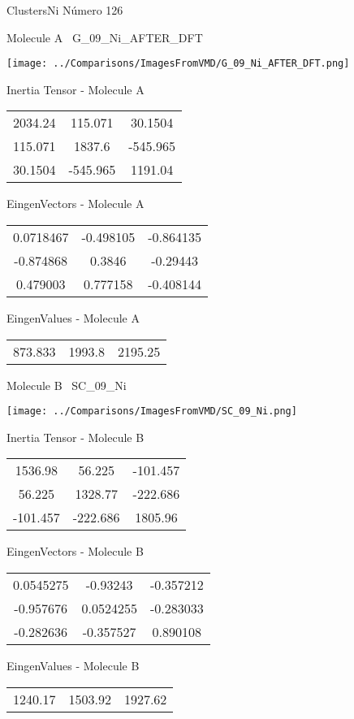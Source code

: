  \newpage

\vtab[-3cm]
\begin{center}
{\large ClustersNi \tab Número 126}
\end{center}
\begin{multicols}{2}
\begin{center}

Molecule A \
G\_09\_Ni\_AFTER\_DFT

\texttt{[image: ../Comparisons/ImagesFromVMD/G\_09\_Ni\_AFTER\_DFT.png]}

Inertia Tensor - Molecule A \\
\begin{tabular}{|c c c|}
2034.24	 & 	115.071	 & 	30.1504	 \\
115.071	 & 	1837.6	 & 	-545.965	 \\
30.1504	 & 	-545.965	 & 	1191.04
\end{tabular}

\vtab
 EingenVectors - Molecule A     \\
\begin{tabular}{|c c c|}
0.0718467	 & 	-0.498105	 & 	-0.864135	 \\
-0.874868	 & 	0.3846	 & 	-0.29443	 \\
0.479003	 & 	0.777158	 & 	-0.408144
\end{tabular}

\vtab
 EingenValues - Molecule A     \\
\begin{tabular}{|c c c|}
873.833	 & 	1993.8	 & 	2195.25	 \\
\end{tabular}
\columnbreak

Molecule B \
SC\_09\_Ni

\texttt{[image: ../Comparisons/ImagesFromVMD/SC\_09\_Ni.png]}

Inertia Tensor - Molecule B \\
\begin{tabular}{|c c c|}
1536.98	 & 	56.225	 & 	-101.457	 \\
56.225	 & 	1328.77	 & 	-222.686	 \\
-101.457	 & 	-222.686	 & 	1805.96
\end{tabular}

\vtab
 EingenVectors - Molecule B     \\
\begin{tabular}{|c c c|}
0.0545275	 & 	-0.93243	 & 	-0.357212	 \\
-0.957676	 & 	0.0524255	 & 	-0.283033	 \\
-0.282636	 & 	-0.357527	 & 	0.890108
\end{tabular}

\vtab
 EingenValues - Molecule B     \\
\begin{tabular}{|c c c|}
1240.17	 & 	1503.92	 & 	1927.62	 \\
\end{tabular}

\end{center}
\end{multicols}

